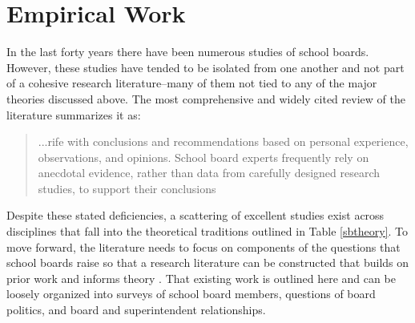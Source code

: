 \section{Empirical Work}
In the last forty years there have been numerous studies of school boards. 
However, these studies have tended to be isolated from one another and not part 
of a cohesive research literature--many of them not tied to any of the major 
theories discussed above. The most comprehensive and widely cited review of the 
literature summarizes it as:

\begin{quote}
\begin{singlespace}
...rife with conclusions and recommendations based on personal experience, 
observations, and opinions. School board experts frequently rely on anecdotal 
evidence, rather than data from carefully designed research studies, to support 
their conclusions \citep[ p.265]{RefWorks:312}
\end{singlespace}
\end{quote}
\vspace{-6pt}


Despite these stated deficiencies, a scattering of excellent studies exist across 
disciplines that fall into the theoretical traditions outlined in Table \ref{sbtheory}. 
To move forward, the literature needs to focus on components of the questions that 
school boards raise so that a research literature can be constructed that builds 
on prior work and informs theory \citep{RefWorks:191}. That existing work is outlined 
here and can be loosely organized into surveys of school board members, questions 
of board politics, and board and superintendent relationships.


